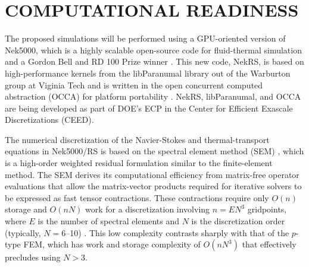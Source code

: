 \vspace{-.25in}
\section{COMPUTATIONAL READINESS} %
\vspace{-.2in}

The proposed simulations will be performed using a GPU-oriented version of
Nek5000, which is a highly scalable open-source code for fluid-thermal
simulation and a Gordon Bell and RD 100 Prize winner \cite{tufo99}.  This new
code, NekRS, is based on high-performance kernels from the libParanumal library
out of the Warburton group at Viginia Tech \cite{warb1,warb2} and is written in
the open concurrent computed abstraction (OCCA) for platform portability
\cite{occa}.  NekRS, libParanumal, and OCCA are being developed as part of
DOE's ECP in the Center for Efficient Exascale
Discretizations (CEED). 

The numerical discretization of the Navier-Stokes and thermal-transport equations
in Nek5000/RS is based on the spectral element method (SEM) \cite{pat84}, which
is a high-order weighted residual formulation similar to the finite-element method.   
The SEM derives its computational efficiency from matrix-free operator
evaluations that allow the matrix-vector products required for iterative
solvers to be expressed as fast tensor contractions.  These contractions
require only $O(n)$ storage and $O(nN)$ work for a discretization involving
$n=EN^3$ gridpoints, where $E$ is the number of spectral elements and $N$ is
the discretization order (typically, $N=$6--10) \cite{dfm02}.  This low
complexity contrasts sharply with that of the $p$-type FEM, which has work and
storage complexity of $O(nN^3)$ that effectively precludes using $N>3$.  

